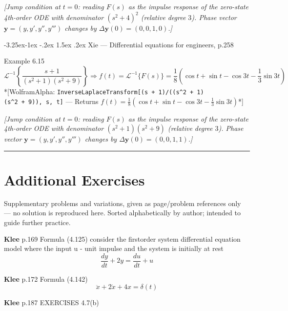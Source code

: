 \documentclass[
  11pt,
]{article}
\makeatletter
\providecommand{\implies}{\Longrightarrow}
\renewcommand\paragraph{\@startsection{paragraph}{4}{\z@}%
                                     {-3.25ex\@plus -1ex \@minus -.2ex}%
                                     {1.5ex \@plus .2ex}%
                                     {\normalfont\normalsize\bfseries}}
\makeatother
\begin{document}
\emph{{[}Jump condition at \(t=0\): reading \(F(s)\) as the impulse
response of the zero-state 4th-order ODE with denominator \((s^2+4)^2\)
(relative degree \(3\)). Phase vector \(\mathbf y=(y,y',y'',y''')\)
changes by \(\Delta\mathbf y(0)=(0,0,1,0)\).{]}}

\hypertarget{xie-differential-equations-for-engineers-p.258-3}{%
\paragraph{Xie --- Differential equations for engineers,
p.258}\label{xie-differential-equations-for-engineers-p.258-3}}

Example 6.15 \[
\mathcal{L}^{-1} \left\{ \frac{s+1}{(s^2+1)(s^2+9)} \right\} \implies f(t) = \mathcal{L}^{-1}\{F(s)\} = \frac{1}{8} \left( \cos t + \sin t - \cos 3t - \frac{1}{3} \sin 3t \right)
\] *{[}WolframAlpha:
\texttt{InverseLaplaceTransform{[}(s\ +\ 1)/((s\^{}2\ +\ 1)(s\^{}2\ +\ 9)),\ s,\ t{]}}
--- Returns
\(f(t) = \frac{1}{8}\left(\cos t + \sin t - \cos 3t - \frac{1}{3}\sin 3t\right)\)*{]}

\emph{{[}Jump condition at \(t=0\): reading \(F(s)\) as the impulse
response of the zero-state 4th-order ODE with denominator
\((s^2+1)(s^2+9)\) (relative degree \(3\)). Phase vector
\(\mathbf y=(y,y',y'',y''')\) changes by
\(\Delta\mathbf y(0)=(0,0,1,1)\).{]}}

\begin{center}\rule{0.5\linewidth}{0.5pt}\end{center}

\hypertarget{additional-exercises}{%
\section{Additional Exercises}\label{additional-exercises}}

Supplementary problems and variations, given as page/problem references
only --- no solution is reproduced here. Sorted alphabetically by
author; intended to guide further practice.

\textbf{Klee} p.169 Formula (4.125) consider the firstorder system
differential equation model where the input u - unit impulse and the
system is initially at rest \[
\frac{dy}{dt} + 2y = \frac{du}{dt} + u
\]

\textbf{Klee} p.172 Formula (4.142) \[
\ddot{x} + 2\dot{x} + 4x = \delta(t)
\]

\textbf{Klee} p.187 EXERCISES 4.7(b)
\end{document}
